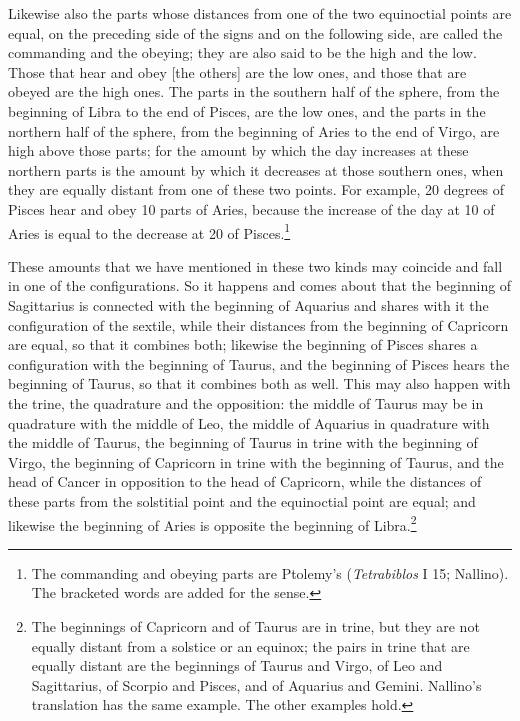 \documentclass[11pt]{article}
\newcommand{\ArPage}[1]{\marginpar{\footnotesize\color{gray}Ar.\,p.\,#1}}
\begin{document}
\par \ArPage{196}Likewise also the parts whose distances from one of the two equinoctial points are equal, on the preceding side of the signs and on the following side, are called the commanding and the obeying; they are also said to be the high and the low. Those that hear and obey [the others] are the low ones, and those that are obeyed are the high ones. The parts in the southern half of the sphere, from the beginning of Libra to the end of Pisces, are the low ones, and the parts in the northern half of the sphere, from the beginning of Aries to the end of Virgo, are high above those parts; for the amount by which the day increases at these northern parts is the amount by which it decreases at those southern ones, when they are equally distant from one of these two points. For example, 20 degrees of Pisces hear and obey 10 parts of Aries, because the increase of the day at 10 of Aries is equal to the decrease at 20 of Pisces.\footnote{The commanding and obeying parts are Ptolemy's (\emph{Tetrabiblos} I 15; Nallino). The bracketed words are added for the sense.}\par
\par These amounts that we have mentioned in these two kinds may coincide and fall in one of the configurations. So it happens and comes about that the beginning of Sagittarius is connected with the beginning of Aquarius and shares with it the configuration of the sextile, while their distances from the beginning of Capricorn are equal, so that it combines both; likewise the beginning of Pisces shares a configuration with the beginning of Taurus, and the beginning of Pisces hears the beginning of Taurus, so that it combines both as well. This may also happen with the trine, the quadrature and the opposition: the middle of Taurus may be in quadrature with the middle of Leo, the middle of Aquarius in quadrature with the middle of Taurus, the beginning of Taurus in trine with the beginning of Virgo, the beginning of Capricorn in trine with the beginning of Taurus, and the head of Cancer in opposition to the head of Capricorn, while the distances of these parts from the solstitial point and the equinoctial point are equal; and likewise the beginning of Aries is opposite the beginning of Libra.\footnote{The beginnings of Capricorn and of Taurus are in trine, but they are not equally distant from a solstice or an equinox; the pairs in trine that are equally distant are the beginnings of Taurus and Virgo, of Leo and Sagittarius, of Scorpio and Pisces, and of Aquarius and Gemini. Nallino's translation has the same example. The other examples hold.}\par
\end{document}
